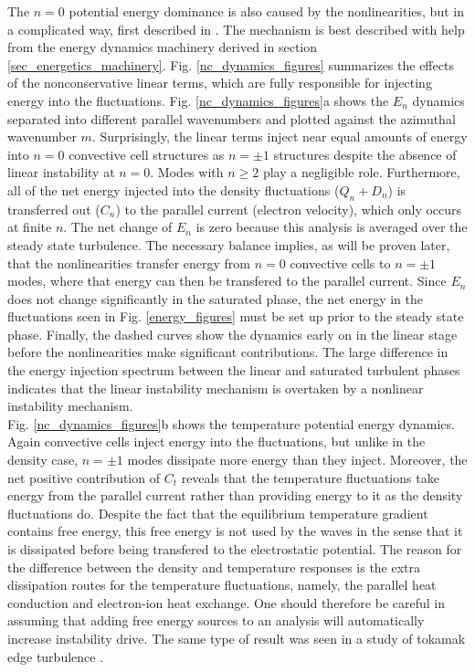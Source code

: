 \documentclass[12pt]{article}
\begin{document}
The $n=0$ potential energy dominance is also caused by the nonlinearities, but in a complicated way, first described in \cite{biskamp1995,drake1995}. The mechanism is best described with
help from the energy dynamics machinery derived in section \ref{sec_energetics_machinery}. Fig. \ref{nc_dynamics_figures} summarizes the effects of the nonconservative linear terms, which are
fully responsible for injecting energy into the fluctuations. Fig. \ref{nc_dynamics_figures}a shows the $E_n$ dynamics separated into different parallel wavenumbers and plotted
against the azimuthal wavenumber $m$. Surprisingly, the linear terms inject near equal amounts of energy into $n=0$ convective cell structures as $n= \pm 1$ structures despite the absence
of linear instability at $n=0$. Modes with $n \ge 2$ play a negligible role. Furthermore, all of the net energy injected into the density fluctuations ($Q_n + D_n$) is transferred out ($C_n$) to
the parallel current (electron velocity), which only occurs at finite $n$. The net change of $E_n$ is zero because this analysis is averaged over the steady state
turbulence. The necessary balance implies, as will be proven later, that the nonlinearities transfer energy from $n=0$ convective cells to $n = \pm 1$ modes, where that energy can then
be transfered to the parallel current.
Since $E_n$ does not change significantly in the saturated phase, the net energy in the fluctuations seen in Fig. \ref{energy_figures} must be set up prior to the steady state phase. 
Finally, the dashed curves show the dynamics early on in the linear stage before the nonlinearities make significant contributions. The large difference in the energy injection spectrum between
the linear and saturated turbulent phases indicates that the linear instability mechanism is overtaken by a nonlinear instability mechanism. \\

Fig. \ref{nc_dynamics_figures}b shows the temperature potential energy dynamics. Again convective cells inject energy into the fluctuations, but unlike in the density case, $n = \pm 1$ modes
dissipate more energy than they inject. Moreover, the net positive contribution of $C_t$ reveals that the temperature fluctuations take energy from the parallel current rather than providing
energy to it as the density fluctuations do. Despite the fact that the equilibrium temperature gradient contains free energy, this free energy is not used by the waves in the sense that it 
is dissipated before being transfered to the electrostatic potential. The reason for the difference
between the density and temperature responses is the extra dissipation routes for the temperature fluctuations, namely, the parallel heat conduction and electron-ion heat exchange.
One should therefore be careful in assuming that adding free energy sources to an analysis will automatically increase instability drive.
The same type of result was seen in a study of tokamak edge turbulence \cite{zeiler1997}. \\
\end{document}
